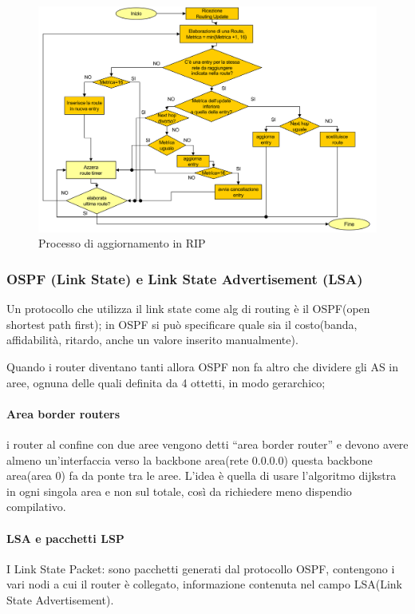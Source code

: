 \begin{figure}[h!]
    \centering
    \includegraphics[width=1\textwidth]{images/processoRIP.png}
    \caption{Processo di aggiornamento in RIP}
    \label{fig:processoRIP}
\end{figure}
\newpage
\subsubsection{OSPF (Link State) e Link State Advertisement (LSA)}

Un protocollo che utilizza il link state come alg di routing è il OSPF(open shortest path first);
in OSPF si può specificare quale sia il costo(banda, affidabilità, ritardo, anche un valore inserito manualmente).

Quando i router diventano tanti allora OSPF non fa altro che dividere gli AS in aree, ognuna delle quali definita da 4 ottetti, in modo gerarchico;
\paragraph{Area border routers}
i router al confine con due aree vengono detti “area border router” e devono avere almeno un'interfaccia verso la backbone area(rete 0.0.0.0)
questa backbone area(area 0) fa da ponte tra le aree.
L'idea è quella di usare l'algoritmo dijkstra in ogni singola area e non sul totale, così da richiedere meno dispendio compilativo.

\paragraph{LSA e pacchetti LSP}
I Link State Packet: sono pacchetti generati dal protocollo OSPF, contengono i vari nodi a cui il router è collegato, informazione contenuta nel campo LSA(Link State Advertisement).

